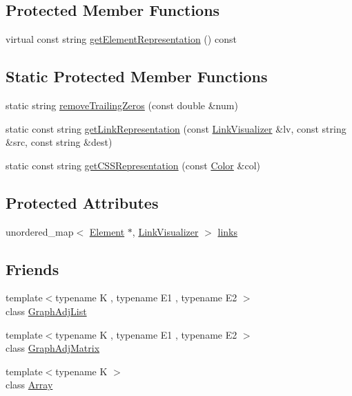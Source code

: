 \subsection*{Protected Member Functions}
\begin{DoxyCompactItemize}
\item 
virtual const string \hyperlink{classbridges_1_1_element_aac13ea6244099496172c8549e48a9f73}{get\+Element\+Representation} () const 
\end{DoxyCompactItemize}
\subsection*{Static Protected Member Functions}
\begin{DoxyCompactItemize}
\item 
static string \hyperlink{classbridges_1_1_element_a0b905a076a71771a20ee4fb0ec858cfa}{remove\+Trailing\+Zeros} (const double \&num)
\item 
static const string \hyperlink{classbridges_1_1_element_ac6fa7b04e28a1e9b8d8f2d395dd6e2c1}{get\+Link\+Representation} (const \hyperlink{classbridges_1_1_link_visualizer}{Link\+Visualizer} \&lv, const string \&src, const string \&dest)
\item 
static const string \hyperlink{classbridges_1_1_element_a513b3409e4b689a390b0dcd50cc2d643}{get\+C\+S\+S\+Representation} (const \hyperlink{classbridges_1_1_color}{Color} \&col)
\end{DoxyCompactItemize}
\subsection*{Protected Attributes}
\begin{DoxyCompactItemize}
\item 
unordered\+\_\+map$<$ \hyperlink{classbridges_1_1_element}{Element} $\ast$, \hyperlink{classbridges_1_1_link_visualizer}{Link\+Visualizer} $>$ \hyperlink{classbridges_1_1_element_a6fb53728edc378f26238543b26238496}{links}
\end{DoxyCompactItemize}
\subsection*{Friends}
\begin{DoxyCompactItemize}
\item 
{\footnotesize template$<$typename K , typename E1 , typename E2 $>$ }\\class \hyperlink{classbridges_1_1_element_a65850138f0763fec43a76fb942f0eccc}{Graph\+Adj\+List}
\item 
{\footnotesize template$<$typename K , typename E1 , typename E2 $>$ }\\class \hyperlink{classbridges_1_1_element_a1935808473b7eb8ff54149c5436c3ac9}{Graph\+Adj\+Matrix}
\item 
{\footnotesize template$<$typename K $>$ }\\class \hyperlink{classbridges_1_1_element_ab1a595168ea1870ce436dfd2d8e69b6d}{Array}
\end{DoxyCompactItemize}


